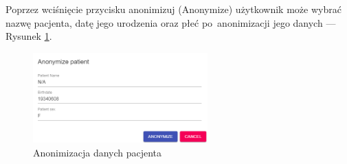 \documentclass[a4paper,11pt,twoside,openright]{report}
\theoremstyle{definition}
\begin{document}
Poprzez wciśnięcie przycisku anonimizuj (Anonymize) użytkownik może wybrać nazwę
pacjenta, datę jego urodzenia oraz płeć po~anonimizacji jego danych --- Rysunek \ref{fig:19}.

\begin{figure}[h!]
	\center
	\includegraphics[width=0.6\textwidth]{19}
	\caption{Anonimizacja danych pacjenta}
    	\label{fig:19}
\end{figure}



\end{document}

